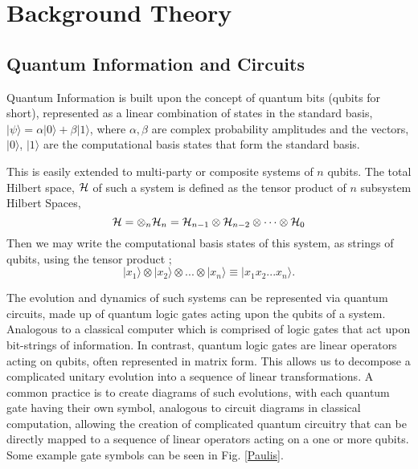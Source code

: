 \section{Background Theory}
\subsection{Quantum Information and Circuits}
\vspace{-0.15in}
Quantum Information is built upon the concept of quantum bits (qubits for short), represented as a linear
combination of states in the standard basis,
$|\psi\rangle = \alpha |0\rangle + \beta |1\rangle$, where $\alpha, \beta$ are complex probability amplitudes
and the vectors, $|0\rangle$, $|1\rangle$ are the computational basis states that form the standard basis.

This is easily extended to multi-party or composite systems of $n$ qubits. The total Hilbert space, $\cal{H}$ of
such a system is defined as the tensor product of $n$ subsystem Hilbert Spaces,
\begin{equation}
    {\cal{H}} = \otimes_n {\cal{H}}_n = {\cal{H}}_{n-1} \otimes {\cal{H}}_{n-2} \otimes \dots \otimes {\cal{H}}_0
\end{equation}
Then we may write the computational basis states of this system, as strings of qubits, using the tensor product \cite{schumacher_westmoreland_2010};
\[|x_1\rangle \otimes |x_2\rangle \otimes ... \otimes |x_n\rangle \equiv |x_1 x_2... x_n \rangle. \]

The evolution and dynamics of such systems can be represented via quantum circuits, made up of quantum logic gates acting
upon the qubits of a system. Analogous to a classical computer which is comprised of logic gates that act upon
bit-strings of information. In contrast, quantum logic gates are linear operators acting
on qubits, often represented in matrix form. This allows us to decompose a complicated unitary evolution into a
sequence of linear transformations. A common practice is to create
diagrams of such evolutions, with each quantum gate having their own symbol, analogous to circuit diagrams in classical
computation, allowing the creation of complicated quantum circuitry that can be directly mapped to a sequence of linear
operators acting on a one or more qubits. Some example gate symbols can be seen in Fig. \ref{Paulis}.




